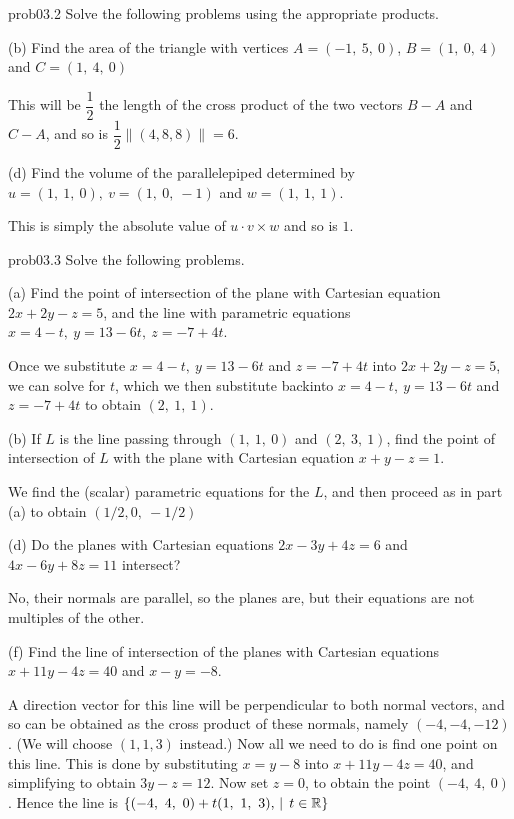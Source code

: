 \begin{sol}{prob03.2}  Solve the following problems using the appropriate products.\medskip


(b) Find the area of the triangle with vertices $A=(-1,\ 5,\
0)$, $B=(1,\ 0,\ 4)$ and $C=(1,\ 4,\ 0)$ 

\soln This will be $\dfrac12$ the length of the cross product of the two vectors $B-A$ and $C-A$, and so is  $\dfrac12\|(4, 8, 8)\|=6$.  

\medskip
(d) Find the volume of the parallelepiped  determined by $u=(1,\ 1,\ 0),\ v=(1,\ 0,\ -1)$ and $w=(1,\ 1,\ 1)$.

\soln This is simply the absolute value of $u \cdot v \times w$ and so is $1$.


\end{sol} \begin{sol}{prob03.3}  Solve the following problems. \medskip

(a) Find the point of intersection of the plane with Cartesian equation $2x+2y-z=5$,
and the line with parametric equations $x=4-t,\ y=13-6t,\ z=-7+4t$.  

\soln Once we substitute $x=4-t,\ y=13-6t$ and $ z=-7+4t$ into $2x+2y-z=5$, we can solve for $t$, which we then substitute backinto $x=4-t,\ y=13-6t$ and $ z=-7+4t$ to obtain $(2,\ 1,\ 1)$.\medskip

\medskip

(b) If $L$ is the line passing through $(1,\ 1,\ 0)$ and $(2,\
3,\ 1)$, find  the point of intersection of $L$ with the plane with Cartesian equation $x+y-z=1$. 

\soln We find the (scalar) parametric equations for the $L$, and then proceed as in part (a) to obtain $(1/2,0,\ -1/2)$


\medskip

(d) Do the planes with Cartesian equations $2x-3y+4z=6$ and $4x-
6y+8z=11$ intersect? 

\soln No, their normals are parallel, so the planes are, but their equations are not multiples of the other.\medskip

\medskip


(f) Find the line of intersection of the planes with Cartesian equations $x+11y-4z=40$ and $x -y=-8$. 

\soln A direction vector for this line will be perpendicular to both normal vectors, and so can be obtained as the cross product of these normals, namely $(-4, -4, -12)$. (We will choose $(1,1,3)$ instead.) Now all we need to do is find one point on this line. This is done by substituting $x= y-8$ into $x+11y-4z=40$, and simplifying to obtain $3y-z=12$. Now set $z=0$, to obtain the point $(-4,\ 4,\ 0)$. Hence the line is $\set{(-4,\ 4,\ 0)+ t (1,\ 1,\ 3),\st  t\in \R}$\medskip

 

\end{sol} 
